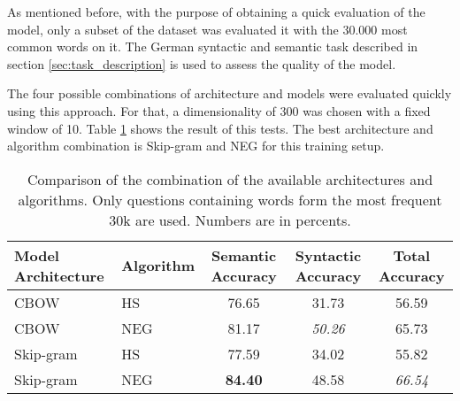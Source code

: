 As mentioned before, with the purpose of obtaining  a quick evaluation of the
model, only a subset of the dataset was evaluated it with the 30.000 
most common words on it. The German syntactic and semantic task described in
section \ref{sec:task_description} is used  to assess the quality of the
model. 

The four possible combinations of architecture and models were evaluated
quickly using this approach. For that, a dimensionality of 300 was chosen with
a fixed window of 10. Table \ref{tab:initial_w2v_comparison} shows the result
of this tests. The best architecture and algorithm combination is
Skip-gram and \ac{NEG} for this training setup.








\begin{table}[h]
\centering
\caption{Comparison of the combination of the available architectures and algorithms.
 Only questions containing words form the most  frequent 30k are used.
 Numbers are in percents.} 
\label{tab:initial_w2v_comparison}


\begin{center}
\small

\begin{tabular}{|l|l|c|c|c|}
\hline
 Model Architecture  &   Algorithm  &  Semantic Accuracy  &  Syntactic Accuracy  &  Total Accuracy  \\
\hline
 CBOW               &  HS                   &              76.65  &               31.73  &           56.59  \\
 CBOW               &  NEG                  &              81.17  &               \textit{50.26}  &           65.73  \\
 Skip-gram          &  HS                   &              77.59  &               34.02  &           55.82  \\
 Skip-gram          &  NEG                  &              \textbf{84.40}  &               48.58  &           \textit{66.54}  \\
\hline
\end{tabular}
\end{center}

\end{table}


